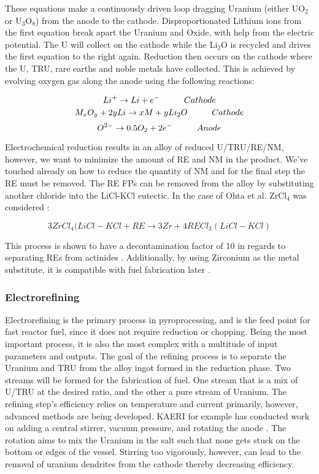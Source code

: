 These equations make a continuously driven loop dragging Uranium (either UO$_2$ or U$_3$O$_8$) from the anode to the cathode. 
Disproportionated Lithium ions from the first equation break apart the Uranium and Oxide, with help from the electric potential.
The U will collect on the cathode while the Li$_2$O is recycled and drives the first equation to the right again. 
Reduction then occurs on the cathode where the U, TRU, rare earths and noble metals have collected.
This is achieved by evolving oxygen gas along the anode using the following reactions\cite{hur_electrochemical_nodate,organisation}:

\[ Li^+ \rightarrow Li + e^- \hspace{10mm} Cathode \]
\[ M_xO_y + 2yLi \rightarrow xM + yLi_2O \hspace{10mm} Cathode \]
\[ O^{2-} \rightarrow 0.5O_2 + 2e^- \hspace{10mm} Anode \]

Electrochemical reduction results in an alloy of reduced U/TRU/RE/NM, however, we want to minimize the amount of RE and NM in the product.
We've touched already on how to reduce the quantity of NM and for the final step the RE must be removed.
The RE FPs can be removed from the alloy by substituting another chloride into the LiCl-KCl eutectic.
In the case of Ohta et al. ZrCl$_4$ was considered \cite{ohta}:

\[ 3ZrCl_4(LiCl-KCl + RE \rightarrow 3Zr + 4RECl_3(LiCl-KCl) \]

This process is shown to have a decontamination factor of 10 in regards to separating REs from actinides \cite{sakamura}. Additionally, by using Zirconium as the metal substitute, it is compatible with fuel fabrication later \cite{ohta}.
\subsubsection{Electrorefining}
Electrorefining is the primary process in pyroprocessing, and is the feed point for fast reactor fuel, since it does not require reduction or chopping.
Being the most important process, it is also the most complex with a multitude of input parameters and outputs. 
The goal of the refining process is to separate the Uranium and TRU from the alloy ingot formed in the reduction phase.
Two streams will be formed for the fabrication of fuel. One stream that is a mix of U/TRU at the desired ratio, and the other a pure stream of Uranium.
The refining step's efficiency relies on temperature and current primarily, however, advanced methods are being developed.
KAERI for example has conducted work on adding a central stirrer, vacuum pressure, and rotating the anode \cite{lee_advanced}.
The rotation aims to mix the Uranium in the salt such that none gets stuck on the bottom or edges of the vessel. 
Stirring too vigorously, however, can lead to the removal of uranium dendrites from the cathode thereby decreasing efficiency.\\

